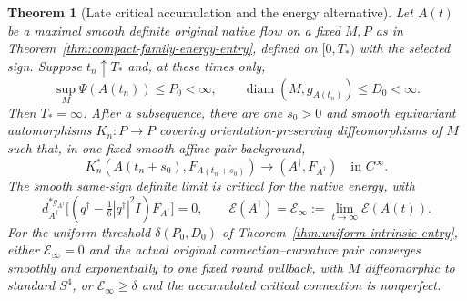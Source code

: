 \documentclass[11pt]{article}
\numberwithin{equation}{section}
\newtheorem{theorem}{Theorem}[section]
\theoremstyle{definition}
\theoremstyle{remark}
\begin{document}
\begin{theorem}[Late critical accumulation and the energy alternative]
\label{thm:late-critical-accumulation}
Let $A(t)$ be a maximal smooth definite original native flow
on a fixed $M,P$ as in
Theorem~\ref{thm:compact-family-energy-entry}, defined on
$[0,T_*)$ with the selected sign. Suppose $t_n\uparrow T_*$
and, at these times only,
\[
 \sup_M\Psi(A(t_n))\le P_0<\infty,\qquad
 \operatorname{diam}(M,g_{A(t_n)})\le D_0<\infty.
\]
Then $T_*=\infty$. After a subsequence, there are one
$s_0>0$ and smooth equivariant automorphisms $K_n:P\to P$
covering orientation-preserving diffeomorphisms of $M$ such that,
in one fixed smooth affine pair background,
\begin{equation}\label{eq:late-critical-normalized-limit}
 K_n^*(A(t_n+s_0),F_{A(t_n+s_0)})
       \longrightarrow(A^\dagger,F_{A^\dagger})
       \quad\text{in }C^\infty.
\end{equation}
The smooth same-sign definite limit is critical for the
native energy, with
\[
 d_{A^\dagger}^{*g_{A^\dagger}}
 \bigl[(q^\dagger-\tfrac16|q^\dagger|^2I)F_{A^\dagger}\bigr]=0,
 \qquad
 \mathscr E(A^\dagger)=\mathscr E_\infty
       :=\lim_{t\to\infty}\mathscr E(A(t)).
\]
For the uniform threshold $\delta(P_0,D_0)$ of
Theorem~\ref{thm:uniform-intrinsic-entry}, either
$\mathscr E_\infty=0$ and the actual original connection--curvature
pair converges smoothly and exponentially to one fixed round
pullback, with $M$ diffeomorphic to standard $S^4$, or
$\mathscr E_\infty\ge\delta$ and the accumulated critical
connection is nonperfect.
\end{theorem}
\end{document}
